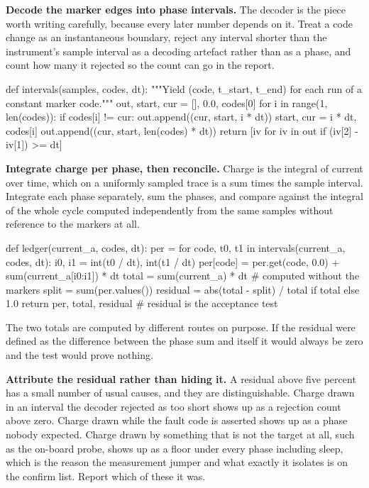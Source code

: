 \begin{steps}
\item \textbf{Decode the marker edges into phase intervals.} The decoder is the
piece worth writing carefully, because every later number depends on it. Treat a
code change as an instantaneous boundary, reject any interval shorter than the
instrument's sample interval as a decoding artefact rather than as a phase, and
count how many it rejected so the count can go in the report.
\begin{pycode}
def intervals(samples, codes, dt):
    """Yield (code, t_start, t_end) for each run of a constant marker code."""
    out, start, cur = [], 0.0, codes[0]
    for i in range(1, len(codes)):
        if codes[i] != cur:
            out.append((cur, start, i * dt))
            start, cur = i * dt, codes[i]
    out.append((cur, start, len(codes) * dt))
    return [iv for iv in out if (iv[2] - iv[1]) >= dt]
\end{pycode}

\item \textbf{Integrate charge per phase, then reconcile.} Charge is the
integral of current over time, which on a uniformly sampled trace is a sum times
the sample interval. Integrate each phase separately, sum the phases, and
compare against the integral of the whole cycle computed independently from the
same samples without reference to the markers at all.
\begin{pycode}
def ledger(current_a, codes, dt):
    per = {}
    for code, t0, t1 in intervals(current_a, codes, dt):
        i0, i1 = int(t0 / dt), int(t1 / dt)
        per[code] = per.get(code, 0.0) + sum(current_a[i0:i1]) * dt
    total = sum(current_a) * dt              # computed without the markers
    split = sum(per.values())
    residual = abs(total - split) / total if total else 1.0
    return per, total, residual              # residual is the acceptance test
\end{pycode}
The two totals are computed by different routes on purpose. If the residual were
defined as the difference between the phase sum and itself it would always be
zero and the test would prove nothing.

\item \textbf{Attribute the residual rather than hiding it.} A residual above
five percent has a small number of usual causes, and they are distinguishable.
Charge drawn in an interval the decoder rejected as too short shows up as a
rejection count above zero. Charge drawn while the fault code is asserted shows
up as a phase nobody expected. Charge drawn by something that is not the target
at all, such as the on-board probe, shows up as a floor under every phase
including sleep, which is the reason the measurement jumper and what exactly it
isolates is on the confirm list. Report which of these it was.


\end{steps}
